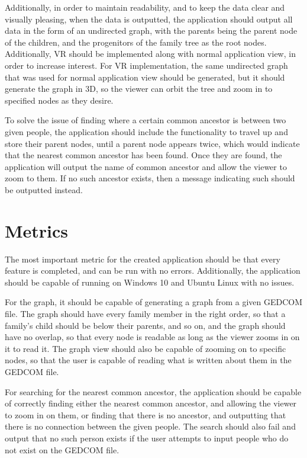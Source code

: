\documentclass[onecolumn, draftclsnofoot,10pt, compsoc]{IEEEtran}
\begin{document}
Additionally, in order to maintain readability, and to keep the data clear and visually pleasing, when the data is outputted, the application should output all data in the form of an undirected graph, with the parents being the parent node of the children, and the progenitors of the family tree as the root nodes. Additionally, VR should be implemented along with normal application view, in order to increase interest. For VR implementation, the same undirected graph that was used for normal application view should be generated, but it should generate the graph in 3D, so the viewer can orbit the tree and zoom in to specified nodes as they desire.

To solve the issue of finding where a certain common ancestor is between two given people, the application should include the functionality to travel up and store their parent nodes, until a parent node appears twice, which would indicate that the nearest common ancestor has been found. Once they are found, the application will output the name of common ancestor and allow the viewer to zoom to them. If no such ancestor exists, then a message indicating such should be outputted instead.

\section{Metrics}

The most important metric for the created application should be that every feature is completed, and can be run with no errors. Additionally, the application should be capable of running on Windows 10 and Ubuntu Linux with no issues.

For the graph, it should be capable of generating a graph from a given GEDCOM file. The graph should have every family member in the right order, so that a family’s child should be below their parents, and so on, and the graph should have no overlap, so that every node is readable as long as the viewer zooms in on it to read it. The graph view should also be capable of zooming on to specific nodes, so that the user is capable of reading what is written about them in the GEDCOM file.

For searching for the nearest common ancestor, the application should be capable of correctly finding either the nearest common ancestor, and allowing the viewer to zoom in on them, or finding that there is no ancestor, and outputting that there is no connection between the given people. The search should also fail and output that no such person exists if the user attempts to input people who do not exist on the GEDCOM file.
\end{document}
